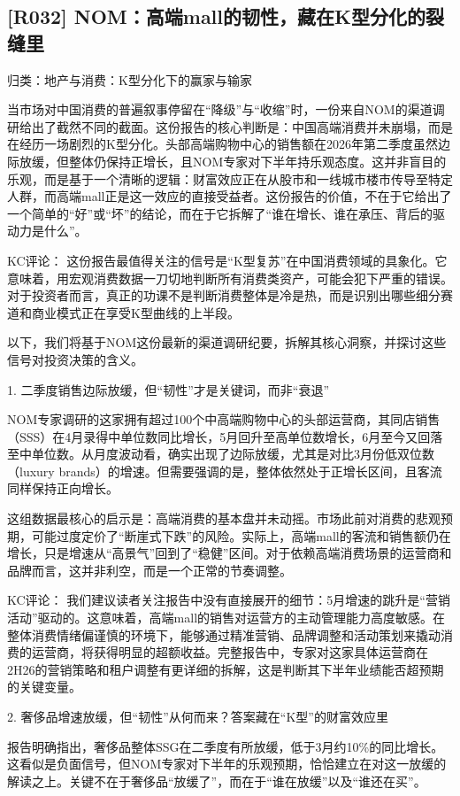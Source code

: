 \documentclass[11pt]{ctexart}
\begin{document}
\subsection{[R032] NOM：高端mall的韧性，藏在K型分化的裂缝里}
{\small\color{refgray}归类：地产与消费：K型分化下的赢家与输家}

当市场对中国消费的普遍叙事停留在“降级”与“收缩”时，一份来自NOM的渠道调研给出了截然不同的截面。这份报告的核心判断是：中国高端消费并未崩塌，而是在经历一场剧烈的K型分化。头部高端购物中心的销售额在2026年第二季度虽然边际放缓，但整体仍保持正增长，且NOM专家对下半年持乐观态度。这并非盲目的乐观，而是基于一个清晰的逻辑：财富效应正在从股市和一线城市楼市传导至特定人群，而高端mall正是这一效应的直接受益者。这份报告的价值，不在于它给出了一个简单的“好”或“坏”的结论，而在于它拆解了“谁在增长、谁在承压、背后的驱动力是什么”。

KC评论： 这份报告最值得关注的信号是“K型复苏”在中国消费领域的具象化。它意味着，用宏观消费数据一刀切地判断所有消费类资产，可能会犯下严重的错误。对于投资者而言，真正的功课不是判断消费整体是冷是热，而是识别出哪些细分赛道和商业模式正在享受K型曲线的上半段。

以下，我们将基于NOM这份最新的渠道调研纪要，拆解其核心洞察，并探讨这些信号对投资决策的含义。

1. 二季度销售边际放缓，但“韧性”才是关键词，而非“衰退”

NOM专家调研的这家拥有超过100个中高端购物中心的头部运营商，其同店销售（SSS）在4月录得中单位数同比增长，5月回升至高单位数增长，6月至今又回落至中单位数。从月度波动看，确实出现了边际放缓，尤其是对比3月份低双位数（luxury brands）的增速。但需要强调的是，整体依然处于正增长区间，且客流同样保持正向增长。

这组数据最核心的启示是：高端消费的基本盘并未动摇。市场此前对消费的悲观预期，可能过度定价了“断崖式下跌”的风险。实际上，高端mall的客流和销售额仍在增长，只是增速从“高景气”回到了“稳健”区间。对于依赖高端消费场景的运营商和品牌而言，这并非利空，而是一个正常的节奏调整。

KC评论： 我们建议读者关注报告中没有直接展开的细节：5月增速的跳升是“营销活动”驱动的。这意味着，高端mall的销售对运营方的主动管理能力高度敏感。在整体消费情绪偏谨慎的环境下，能够通过精准营销、品牌调整和活动策划来撬动消费的运营商，将获得明显的超额收益。完整报告中，专家对这家具体运营商在2H26的营销策略和租户调整有更详细的拆解，这是判断其下半年业绩能否超预期的关键变量。

2. 奢侈品增速放缓，但“韧性”从何而来？答案藏在“K型”的财富效应里

报告明确指出，奢侈品整体SSG在二季度有所放缓，低于3月约10\%的同比增长。这看似是负面信号，但NOM专家对下半年的乐观预期，恰恰建立在对这一放缓的解读之上。关键不在于奢侈品“放缓了”，而在于“谁在放缓”以及“谁还在买”。
\end{document}
